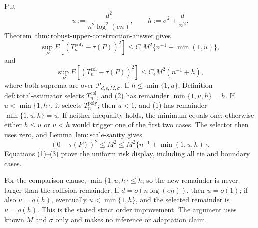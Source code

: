 Put
\[
 u:=\frac{d^2}{n^2\log^2(en)},\qquad h:=\sigma^2+\frac d{n^2}.
\]
Theorem~\(\mathrm{thm:robust\text{-}upper\text{-}construction\text{-}answer}\) gives
\[
 \sup_PE[(T_n^{\mathrm{poly}}-\tau(P))^2]
 \le C_\epsilon M^2\{n^{-1}+\min(1,u)\},
\tag{1}
\]
and
\[
 \sup_PE[(T_n^{\mathrm{col}}-\tau(P))^2]
 \le C_\epsilon M^2(n^{-1}+h),
\tag{2}
\]
where both suprema are over \(\mathcal P_{d,\epsilon,M,\sigma}\).  If \(h\le\min\{1,u\}\), Definition~\(\mathrm{def:total\text{-}estimator}\) selects \(T_n^{\mathrm{col}}\), and (2) has remainder \(\min\{1,u,h\}=h\).  If \(u<\min\{1,h\}\), it selects \(T_n^{\mathrm{poly}}\); then \(u<1\), and (1) has remainder \(\min\{1,u,h\}=u\).  If neither inequality holds, the minimum equals one: otherwise either \(h\le u\) or \(u<h\) would trigger one of the first two cases.  The selector then uses zero, and Lemma~\(\mathrm{lem:scale\text{-}sanity}\) gives
\[
 (0-\tau(P))^2\le M^2\le M^2\{n^{-1}+\min(1,u,h)\}.
\tag{3}
\]
Equations (1)--(3) prove the uniform risk display, including all tie and boundary cases.

For the comparison clause, \(\min\{1,u,h\}\le h\), so the new remainder is never larger than the collision remainder.  If \(d=o(n\log(en))\), then \(u=o(1)\); if also \(u=o(h)\), eventually \(u<\min\{1,h\}\), and the selected remainder is \(u=o(h)\).  This is the stated strict order improvement.  The argument uses known \(M\) and \(\sigma\) only and makes no inference or adaptation claim.